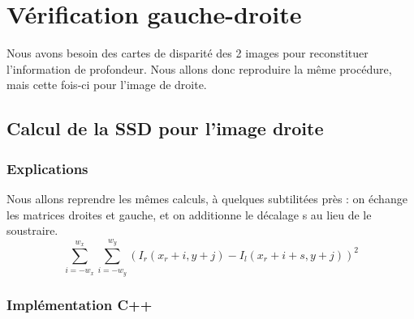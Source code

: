 \documentclass[a4paper]{article}
\begin{document}
\clearpage

\section{Vérification gauche-droite}
Nous avons besoin des cartes de disparité des 2 images pour reconstituer l'information de profondeur. Nous allons donc reproduire la même procédure, mais cette fois-ci pour l'image de droite.

\subsection{Calcul de la SSD pour l'image droite}

\subsubsection{Explications}
Nous allons reprendre les mêmes calculs, à quelques subtilitées près : on échange les matrices droites et gauche, et on additionne le décalage s au lieu de le soustraire.
\begin{equation}
\sum_{i=-w_x}^{w_x} \sum_{i=-w_y}^{w_y} (I_r(x_r+i,y+j)-I_l(x_r+i+s,y+j))^2
\end{equation}

\subsubsection{Implémentation C++}
\end{document}
